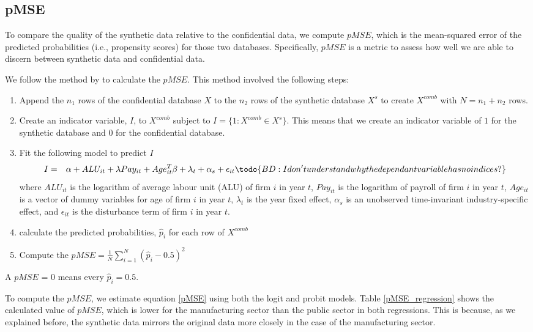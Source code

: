 \documentclass{article}
\begin{document}
\subsection{pMSE}

To compare the quality of the synthetic data relative to the confidential data, we compute $pMSE$, which is the mean-squared error of the predicted probabilities (i.e., propensity scores) for those two databases. Specifically, $pMSE$ is a metric to assess how well we are able to discern between synthetic data and confidential data. %

We follow the method by \textcite{SnokeSlavkovic2018} to calculate the $pMSE$. This method involved the following steps: 
\begin{enumerate}
    \item Append the $n_1$ rows of the confidential database $X$ to the $n_2$ rows of the synthetic database $X^s$ to create $X^{comb}$ with $N=n_1 + n_2$ rows.
    \item Create an indicator variable, $I$, to $X^{comb}$ subject to $I=\{1: X^{comb} \in X^s\}$. This means that we create an indicator variable of $1$ for the synthetic database and $0$ for the confidential database. 
    \item Fit the following model to predict $I$
    \begin{eqnarray}	
        I & = &\alpha + ALU_{it} + \lambda Pay_{it} + Age_{it}^{T}\beta + \lambda_t + \alpha_s + \epsilon_{it} \label{pMSE}\todo{BD: I don't understand why the dependant variable has no indices?}
     \end{eqnarray}
    where $ALU_{it}$ is the logarithm of average labour unit (ALU) of firm $i$ in year $t$, $Pay_{it}$ is the logarithm of payroll of firm $i$ in year $t$, $Age_{it}$ is a vector of dummy variables for age of firm $i$ in year $t$, $\lambda_t$ is the year fixed effect, $\alpha_s$ is an unobserved time-invariant industry-specific effect, and $\epsilon_{it}$ is the disturbance term of firm $i$ in year $t$. 
    \item calculate the predicted probabilities, $\hat{p}_i$ for each row of $X^{comb}$
    \item Compute the $pMSE=\frac{1}{N}\sum_{i=1}^N(\hat{p}_i - 0.5)^2$
\end{enumerate}
A $pMSE$ = 0 means every $\hat{p}_i = 0.5$. %

To compute the $pMSE$, we estimate equation \ref{pMSE} using both the logit and probit models. Table \ref{pMSE_regression}  shows the calculated value of $pMSE$, which is lower for the manufacturing sector than the public sector in both regressions. This is because, as we explained before, the synthetic data mirrors the original data more closely in the case of the manufacturing sector.
\end{document}
